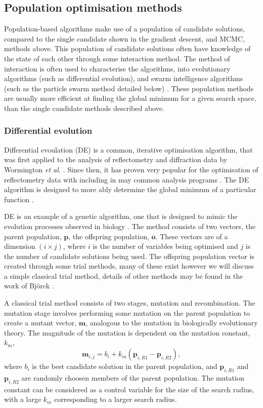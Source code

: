 \subsection{Population optimisation methods}
Population-based algorithms make use of a population of candidate solutions, compared to the single candidate shown in the gradient descent, and MCMC, methods above.
This population of candidate solutions often have knowledge of the state of each other through some interaction method.
The method of interaction is often used to characterise the algorithms, into evolutionary algorithms (such as differential evolution), and swarm intelligence algorithms (such as the particle swarm method detailed below) \cite{wu_ensemble_2019}.
These population methods are usually more efficient at finding the global minimum for a given search space, than the single candidate methods described above.

\subsubsection{Differential evolution}
\label{sec:de}
Differential evoulation (DE) is a common, iterative optimisation algorithm, that was first applied to the analysis of reflectometry and diffraction data by Wormington \emph{et al.} \cite{wormington_characterization_1999}.
Since then, it has proven very popular for the optimisation of reflectometry data with including in may common analysis programs \cite{bjorck_fitting_2011,bjorck_genx_2007,nelson_co-refinement_2006,nelson_refnx_2019,ott_simulreflec_2008,kienzle_ncnr_2006}.
The DE algorithm is designed to more ably determine the global minimum of a particular function \cite{storn_differential_1997}.

DE is an example of a genetic algorithm, one that is designed to mimic the evolution processes observed in biology \cite{holland_adaptation_1992}.
The method consists of two vectors, the parent population, $\mathbf{p}$, the offspring population, $\mathbf{o}$.
These vectors are of a dimension $(i\times j)$, where $i$ is the number of variables being optimised and $j$ is the number of candidate solutions being used.
The offspring population vector is created through some trial methods, many of these exist however we will discuss a simple classical trial method, details of other methods may be found in the work of Bj\"{o}rck \cite{bjorck_fitting_2011}.

A classical trial method consists of two stages, mutation and recombination.
The mutation stage involves performing some mutation on the parent population to create a mutant vector, $\mathbf{m}$, analogous to the mutation in biologically evolutionary theory.
The magnitude of the mutation is dependent on the mutation constant, $k_m$,
%
\begin{equation}
\mathbf{m}_{i,j}= b_{i} + k_m(\mathbf{p}_{i,R1} - \mathbf{p}_{i,R2}),
\end{equation}
%
where $b_{i}$ is the best candidate solution in the parent population, and $\mathbf{p}_{i,R1}$ and $\mathbf{p}_{i,R2}$ are randomly choosen members of the parent population.
The mutation constant can be considered as a control variable for the size of the search radius, with a large $k_m$ corresponding to a larger search radius.

